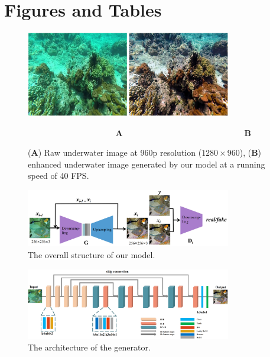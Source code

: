 \documentclass[utf8]{FrontiersinHarvard} %
\begin{document}

\section*{Figures and Tables}
\begin{figure}[htbp]
\begin{center}
\includegraphics[width=0.8\textwidth]{FSpiralGAN_frontiers/onepicture/start_picture300.jpg}
\end{center}
$~~~~~~~~~~~~~~~~~~~~~~~~~~~~~~~~~~~~~~~~~~~~~~~~$\textbf{A} $~~~~~~~~~~~~~~~~~~~~~~~~~~~~~~~~~~~~~~~~~~~~~~~~~~~~~~~~~~~~~~~~~$\textbf{B} 
 \caption{(\textbf{A}) Raw underwater image at 960p resolution ($1280\times960$), (\textbf{B}) enhanced underwater image generated by our model at a running speed of 40 FPS.\label{fig:start picture}}
\end{figure}

\begin{figure}[htbp]
\begin{center}
\includegraphics[width=0.8\textwidth]{FSpiralGAN_frontiers/onepicture/overrall_model300.jpg}
\end{center}
 \caption{The overall structure of our model.\label{fig:overviewofarchitecture}}
\end{figure}

\begin{figure}[htbp]
\begin{center}
\includegraphics[width=0.8\textwidth]{FSpiralGAN_frontiers/onepicture/generator300.jpg}
\end{center}
 \caption{The architecture of the generator.\label{fig:generatorarchitecture}}
\end{figure}
\end{document}
